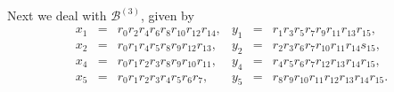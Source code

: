 \documentclass[letterpaper,10pt]{amsart}
\newcommand{\B}{{\mathcal{B}}}
\theoremstyle{definition}
\numberwithin{equation}{section}
\begin{document}
Next we deal with $\B^{(3)}$, given by 
\begin{equation} \label{B3quads} \begin{matrix} x_1 & = & r_0 r_2 r_4 r_6 r_8 r_{10} r_{12} r_{14}, & y_1 & = & r_1 r_3 r_5 r_7 r_9 r_{11} r_{13} r_{15}, \\
x_2 & = & r_0 r_1 r_4 r_5 r_8 r_9 r_{12} r_{13}, & y_2 & = & r_2 r_3 r_6 r_7 r_{10} r_{11} r_{14} s_{15}, \\
x_4 & = & r_0 r_1 r_2 r_3 r_8 r_9 r_{10} r_{11}, & y_4 & = & r_4 r_5 r_6 r_7 r_{12} r_{13} r_{14} r_{15}, \\
x_5 & = & r_0 r_1 r_2 r_3 r_4 r_5 r_6 r_7, & y_5 & = & r_8 r_9 r_{10} r_{11} r_{12} r_{13} r_{14} r_{15}. 
\end{matrix}
\end{equation} 
\end{document}

